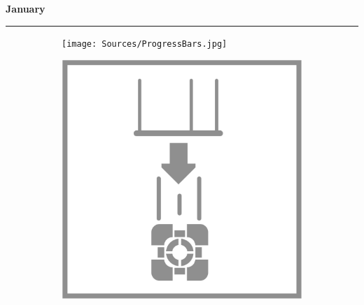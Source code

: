  \hfill \sffamily\textbf{\fontsize{16}{20}\selectfont January} \par
\rule{\linewidth}{0.1cm} \par

\begin{figure}[H]
    \begin{subfigure}[l]{23pt}
        \texttt{[image: Sources/ProgressBars.jpg]}
    \end{subfigure}
\end{figure}

\vfill

\begin{figure}[H]
  \begin{subfigure}[l]{0.195\linewidth}
    \includegraphics[width=\textwidth]{Sources/PortalIcons/d1.jpg}
  \end{subfigure}
  \begin{subfigure}[l]{0.195\linewidth}

\end{subfigure}
\end{figure}
